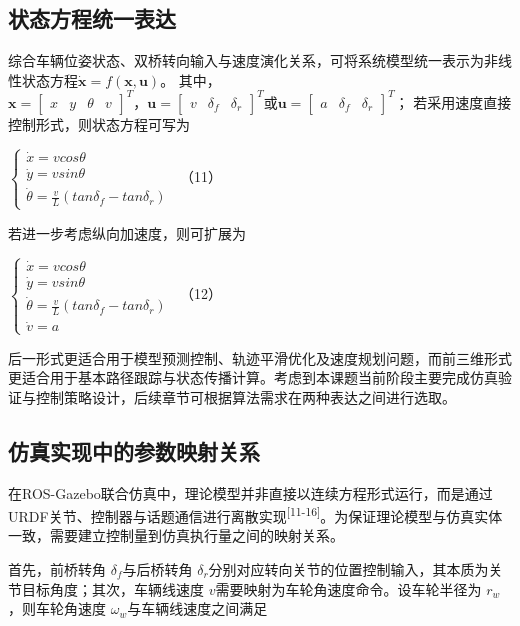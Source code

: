 \subsection{状态方程统一表达}

综合车辆位姿状态、双桥转向输入与速度演化关系，可将系统模型统一表示为非线性状态方程\(\dot{\mathbf{x}} = f(\mathbf{x},\mathbf{u})\)。\(
\) 其中，\(\mathbf{x} = \begin{bmatrix}
x & y & \theta & v
\end{bmatrix}^{T}，\mathbf{u} = \begin{bmatrix}
v & \delta_{f} & \delta_{r}
\end{bmatrix}^{T}\text{或}\mathbf{u} = \begin{bmatrix}
a & \delta_{f} & \delta_{r}
\end{bmatrix}^{T}\)；\(
\) 若采用速度直接控制形式，则状态方程可写为

\(\left\{ \begin{array}{r}
\dot{x} = vcos\theta \\
\dot{y} = vsin\theta \\
\dot{\theta} = \frac{v}{L}\left( tan\delta_{f} - tan\delta_{r} \right)
\end{array} \right.\ \) （11）

若进一步考虑纵向加速度，则可扩展为

\(\left\{ \begin{array}{r}
\dot{x} = vcos\theta \\
\dot{y} = vsin\theta \\
\dot{\theta} = \frac{v}{L}\left( tan\delta_{f} - tan\delta_{r} \right) \\
\dot{v} = a
\end{array} \right.\ \) （12）

后一形式更适合用于模型预测控制、轨迹平滑优化及速度规划问题，而前三维形式更适合用于基本路径跟踪与状态传播计算。考虑到本课题当前阶段主要完成仿真验证与控制策略设计，后续章节可根据算法需求在两种表达之间进行选取。

\subsection{仿真实现中的参数映射关系}

在ROS-Gazebo联合仿真中，理论模型并非直接以连续方程形式运行，而是通过URDF关节、控制器与话题通信进行离散实现\textsuperscript{[11-16]}。为保证理论模型与仿真实体一致，需要建立控制量到仿真执行量之间的映射关系。

首先，前桥转角 \(\delta_{f}\)与后桥转角
\(\delta_{r}\)分别对应转向关节的位置控制输入，其本质为关节目标角度；其次，车辆线速度
\(v\)需要映射为车轮角速度命令。设车轮半径为 \(r_{w}\)，则车轮角速度
\(\omega_{w}\)与车辆线速度之间满足

